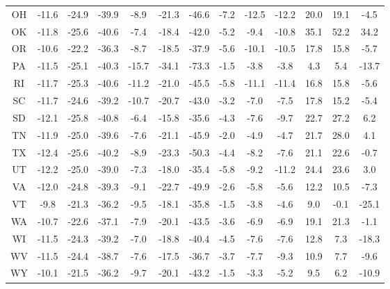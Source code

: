 \begin{table}
\begin{tabular}{ccccccccccccc}
   OH & -11.6 & -24.9 & -39.9 &  -8.9 & -21.3 &  -46.6 & -7.2 & -12.5 & -12.2 & 20.0 &  19.1 &  -4.5 \\
   OK & -11.8 & -25.6 & -40.6 &  -7.4 & -18.4 &  -42.0 & -5.2 &  -9.4 & -10.8 & 35.1 &  52.2 &  34.2 \\
   OR & -10.6 & -22.2 & -36.3 &  -8.7 & -18.5 &  -37.9 & -5.6 & -10.1 & -10.5 & 17.8 &  15.8 &  -5.7 \\
   PA & -11.5 & -25.1 & -40.3 & -15.7 & -34.1 &  -73.3 & -1.5 &  -3.8 &  -3.8 &  4.3 &   5.4 & -13.7 \\
   RI & -11.7 & -25.3 & -40.6 & -11.2 & -21.0 &  -45.5 & -5.8 & -11.1 & -11.4 & 16.8 &  15.8 &  -5.6 \\
   SC & -11.7 & -24.6 & -39.2 & -10.7 & -20.7 &  -43.0 & -3.2 &  -7.0 &  -7.5 & 17.8 &  15.2 &  -5.4 \\
   SD & -12.1 & -25.8 & -40.8 &  -6.4 & -15.8 &  -35.6 & -4.3 &  -7.6 &  -9.7 & 22.7 &  27.2 &   6.2 \\
   TN & -11.9 & -25.0 & -39.6 &  -7.6 & -21.1 &  -45.9 & -2.0 &  -4.9 &  -4.7 & 21.7 &  28.0 &   4.1 \\
   TX & -12.4 & -25.6 & -40.2 &  -8.9 & -23.3 &  -50.3 & -4.4 &  -8.2 &  -7.6 & 21.1 &  22.6 &  -0.7 \\
   UT & -12.2 & -25.0 & -39.0 &  -7.3 & -18.0 &  -35.4 & -5.8 &  -9.2 & -11.2 & 24.4 &  23.6 &   3.0 \\
   VA & -12.0 & -24.8 & -39.3 &  -9.1 & -22.7 &  -49.9 & -2.6 &  -5.8 &  -5.6 & 12.2 &  10.5 &  -7.3 \\
   VT &  -9.8 & -21.3 & -36.2 &  -9.5 & -18.1 &  -35.8 & -1.5 &  -3.8 &  -4.6 &  9.0 &  -0.1 & -25.1 \\
   WA & -10.7 & -22.6 & -37.1 &  -7.9 & -20.1 &  -43.5 & -3.6 &  -6.9 &  -6.9 & 19.1 &  21.3 &  -1.1 \\
   WI & -11.5 & -24.3 & -39.2 &  -7.0 & -18.8 &  -40.4 & -4.5 &  -7.6 &  -7.6 & 12.8 &   7.3 & -18.3 \\
   WV & -11.5 & -24.4 & -38.7 &  -7.6 & -17.5 &  -36.7 & -3.7 &  -7.7 &  -9.3 & 10.9 &   7.7 &  -9.6 \\
   WY & -10.1 & -21.5 & -36.2 &  -9.7 & -20.1 &  -43.2 & -1.5 &  -3.3 &  -5.2 &  9.5 &   6.2 & -10.9 \\
\bottomrule
\end{tabular}
\end{table}
